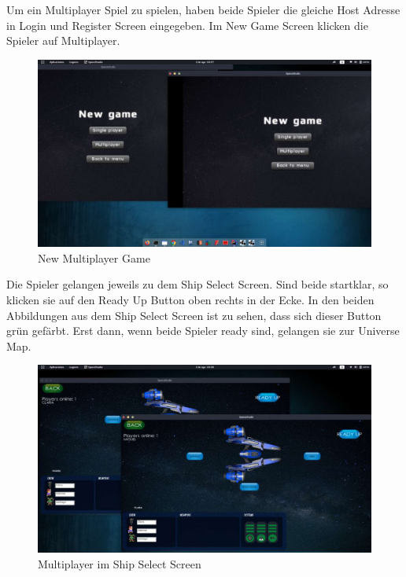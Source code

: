 \documentclass[fontsize=12pt,paper=a4,twoside]{scrartcl}
\begin{document}
Um ein Multiplayer Spiel zu spielen, haben beide Spieler die gleiche Host Adresse in Login und Register Screen eingegeben.
Im New Game Screen klicken die Spieler auf Multiplayer.\\
\begin{figure}[htp]
	\centering
	\includegraphics[width=1.00\linewidth]{pics/1.PNG}
	\caption{New Multiplayer Game}
\end{figure}

Die Spieler gelangen jeweils zu dem Ship Select Screen. Sind beide startklar, so klicken sie auf den
Ready Up Button oben rechts in der Ecke.
In den beiden Abbildungen aus dem Ship Select Screen ist zu sehen, dass sich dieser Button grün gefärbt.
Erst dann, wenn beide Spieler ready sind, gelangen sie zur Universe Map.

\begin{figure}[htp]
	\centering
	\includegraphics[width=1.00\linewidth]{pics/2.PNG}
	\caption{Multiplayer im Ship Select Screen}
\end{figure}
\end{document}
